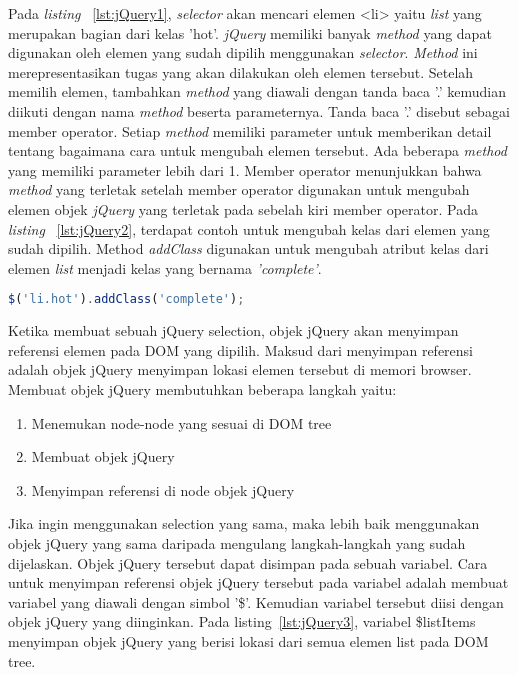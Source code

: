 Pada \textit{listing} ~\ref{lst:jQuery1}, \textit{selector} akan mencari elemen <li> yaitu \textit{list} yang merupakan bagian dari kelas 'hot'. \textit{jQuery} memiliki banyak \textit{method} yang dapat digunakan oleh elemen yang sudah dipilih menggunakan \textit{selector}. \textit{Method} ini merepresentasikan tugas yang akan dilakukan oleh elemen tersebut. Setelah memilih elemen, tambahkan \textit{method} yang diawali dengan tanda baca '.' kemudian diikuti dengan nama \textit{method} beserta parameternya. Tanda baca '.' disebut sebagai member operator. Setiap \textit{method} memiliki parameter untuk memberikan detail tentang bagaimana cara untuk mengubah elemen tersebut. Ada beberapa \textit{method} yang memiliki parameter lebih dari 1.  Member operator menunjukkan bahwa \textit{method} yang terletak setelah member operator digunakan untuk mengubah elemen objek \textit{jQuery} yang terletak pada sebelah kiri member operator. Pada \textit{listing} ~\ref{lst:jQuery2}, terdapat contoh untuk mengubah kelas dari elemen yang sudah dipilih. Method \textit{addClass} digunakan untuk mengubah atribut kelas dari elemen \textit{list} menjadi kelas yang bernama \textit{'complete'}. 

\begin{lstlisting}[language=Javascript, caption=Mengubah kelas dari elemen yang sudah dipilih, label={lst:jQuery2}]
	$('li.hot').addClass('complete');
\end{lstlisting}

Ketika membuat sebuah jQuery selection, objek jQuery akan menyimpan referensi elemen pada DOM yang dipilih. Maksud dari menyimpan referensi adalah objek jQuery menyimpan lokasi elemen tersebut di memori browser. Membuat objek jQuery membutuhkan beberapa langkah yaitu: 

\begin{enumerate}
	\item Menemukan node-node yang sesuai di DOM tree
	\item Membuat objek jQuery
	\item Menyimpan referensi di node objek jQuery
\end{enumerate}

Jika ingin menggunakan selection yang sama, maka lebih baik menggunakan objek jQuery yang sama daripada mengulang langkah-langkah yang sudah dijelaskan. Objek jQuery tersebut dapat disimpan pada sebuah variabel. Cara untuk menyimpan referensi objek jQuery tersebut pada variabel adalah membuat variabel yang diawali dengan simbol '\$'. Kemudian variabel tersebut diisi dengan objek jQuery yang diinginkan. Pada listing~\ref{lst:jQuery3}, variabel \$listItems menyimpan objek jQuery yang berisi lokasi dari semua elemen list pada DOM tree.

